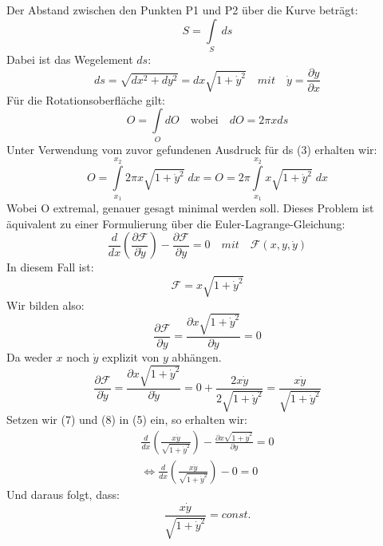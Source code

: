 \documentclass[a4paper,german,12pt,smallheadings]{scrartcl}
\begin{document}
Der Abstand zwischen den Punkten P1 und P2 über die Kurve beträgt:
\begin{equation}
S=\int\limits_S\ ds
\end{equation}
Dabei ist das Wegelement $ds$:
\begin{equation}
ds=\sqrt{dx^2+dy^2}=dx\sqrt{1+\dot{y}^2} \quad mit \quad \dot{y}=\frac{\partial y}{\partial x}
\end{equation}
Für die Rotationsoberfläche gilt:
\begin{equation}
O=\int\limits_O dO \quad \text{wobei} \quad dO=2\pi x ds
\end{equation}
Unter Verwendung vom zuvor gefundenen Ausdruck für ds (3) erhalten wir:
\begin{equation}
O=\int\limits_{x_1}^{x_2} 2\pi x \sqrt{1+\dot{y}^2} \; dx = O=2\pi \int\limits_{x_1}^{x_2} x \sqrt{1+\dot{y}^2} \; dx
\end{equation}
Wobei O extremal, genauer gesagt minimal werden soll. Dieses Problem ist äquivalent zu einer Formulierung über die Euler-Lagrange-Gleichung:
\begin{equation}
\frac{d}{dx}\left(\frac{\partial \mathcal{F}}{\partial \dot{y}}\right)-\frac{\partial \mathcal{F}}{\partial y}=0 \quad mit \quad \mathcal{F}(x,y,\dot{y})
\end{equation}
In diesem Fall ist:
\begin{equation}
\mathcal{F}=x \sqrt{1+\dot{y}^2}
\end{equation}
Wir bilden also:
\begin{equation}
\frac{\partial \mathcal{F}}{\partial y}=\frac{\partial x \sqrt{1+\dot{y}^2}}{\partial y}=0
\end{equation}
Da weder $x$ noch $\dot{y}$ explizit von $y$ abhängen.
\begin{equation}
\frac{\partial \mathcal{F}}{\partial \dot{y}}=\frac{\partial x \sqrt{1+ \dot{y}^2}}{\partial \dot{y}}=0 + \frac{2x \dot{y}}{2 \sqrt{1+ \dot{y}^2}}=\frac{x \dot{y}}{\sqrt{1+ \dot{y}^2}}
\end{equation}
Setzen wir (7) und (8) in (5) ein, so erhalten wir:
\begin{align*}
\frac{d}{dx}\left(\frac{x \dot{y}}{\sqrt{1+ \dot{y}^2}}\right)-\frac{\partial x \sqrt{1+\dot{y}^2}}{\partial y}=0\\
\Leftrightarrow \frac{d}{dx}\left(\frac{x \dot{y}}{\sqrt{1+ \dot{y}^2}}\right)-0=0
\end{align*}
Und daraus folgt, dass:
\begin{equation}
\frac{x \dot{y}}{\sqrt{1+ \dot{y}^2}}=const.
\end{equation}
\end{document}

